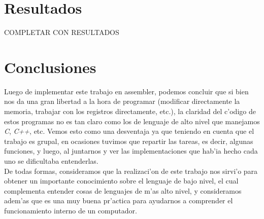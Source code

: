 \documentclass[11pt,a4paper,spanish]{article}
\begin{document}
\newpage
\section{Resultados}
COMPLETAR CON RESULTADOS

\section{Conclusiones}
Luego de implementar este trabajo en assembler, podemos concluir que si bien nos da una gran libertad a la hora de programar (modificar directamente la memoria, trabajar con los registros directamente, etc.), la claridad del c'odigo de estos programas no es tan claro como los de lenguaje de alto nivel que manejamos \textit{C}, \textit{C++}, etc. Vemos esto como una desventaja ya que teniendo en cuenta que el trabajo es grupal, en ocasiones tuvimos que repartir las tareas, es decir, algunas funciones, y luego, al juntarnos y ver las implementaciones que hab'ia hecho cada uno se dificultaba entenderlas. \\
De todas formas, consideramos que la realizaci'on de este trabajo nos sirvi'o para obtener un importante conocimiento sobre el lenguaje de bajo nivel, el cual complementa entender cosas de lenguajes de m'as alto nivel, y consideramos adem'as que es una muy buena pr'actica para ayudarnos a comprender el funcionamiento interno de un computador.
\end{document}
